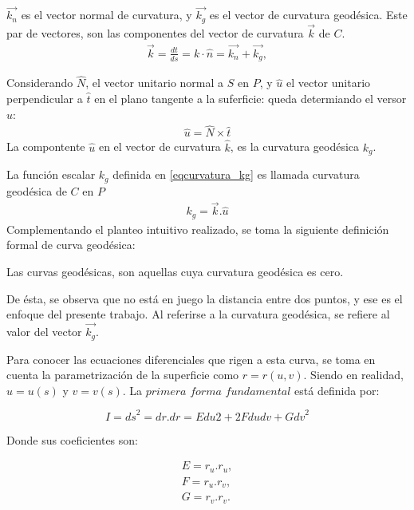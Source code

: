 \documentclass{endm}
\begin{document}
$\vec{k_n}$ es el vector normal de curvatura, y $\vec {k_g}$ es el vector de curvatura geod\'esica. Este par de vectores, son las componentes del vector de curvatura $\vec{k}$ de $C$. 
\small{
\begin{align} 
 \vec {k} = \frac{dt}{ds} = k \cdot \hat{n} = \vec {k_n} + \vec {k_g}, \label{eq1tangente}
\end{align}
}

Considerando $\hat{N}$, el vector unitario normal a $S$ en $P$, y $\hat{u}$ el vector unitario perpendicular a $\hat{t}$ en el plano tangente a la suferficie: queda determiando el versor $\hat{u}$:
\small{
\begin{align}
\hat{u} = \hat{N} \times \hat{t}
 \label{vector_u}
\end{align}
}
La compontente $\hat{u}$ en el vector de curvatura $\hat{k}$, es la curvatura geod\'esica $k_g$.

La funci\'on escalar $k_g$ definida en \ref{eqcurvatura_kg} es llamada curvatura geod\'esica de $C$ en $P$
\small{
\begin{align} 
k_g = \vec{k} .\hat{u}
 \label{eqcurvatura_kg}
\end{align}
}
Complementando el planteo intuitivo realizado, se toma la siguiente definici\'on formal de curva geod\'esica\cite{Patrikalakis}:

\begin{defn}
Las curvas geod\'esicas, son aquellas cuya curvatura geod\'esica es cero.
\end{defn}

De \'esta, se observa que no est\'a en juego la distancia entre dos puntos, y ese es el enfoque del presente trabajo. Al referirse a la curvatura geod\'esica, se refiere al valor del vector $\vec {k_g}$.


Para conocer las ecuaciones diferenciales que rigen a esta curva, se toma en cuenta la parametrizaci\'on de la superficie como $r=r(u,v)$. Siendo en realidad, $u=u(s)$ y $v=v(s)$. La $primera$ $forma$ $fundamental$ está definida por:

$$I = {ds}^2 = dr.dr = E{du}2 + 2Fdudv + G{dv}^2$$

Donde sus coeficientes son:

{\small
\begin{align} 
E = r_u . r_u \label{eqE}, \\ 
F = r_u . r_v \label{eqF}, \\
G = r_v . r_v \label{eqG}.
\end{align}
}
\end{document}
